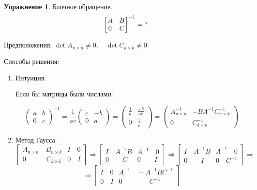 \documentclass[12pt]{article} %
\theoremstyle{definition} %
\newtheorem{exercise}{Упражнение}[section]
\begin{document}
\begin{exercise}
Блочное обращение.
\[
\begin{bmatrix}
A & B \\
0 & C
\end{bmatrix}^{-1}
= \\
?
\]

Предположения: $
\det A_{n \times n} \neq 0; \quad \det C_{k \times k} \neq 0$.

Способы решения:
\begin{enumerate}
\item Интуиция.

Если бы матрицы были числами:

\[ \displaystyle
\begin{pmatrix} a & b\\ 0 & c \end{pmatrix}^{-1} = \frac{1}{ac} \begin{pmatrix} c & -b\\ 0 & a \end{pmatrix} = \begin{pmatrix} \frac{1}{a} & \frac{-b}{ac} \\ 0 & \frac{1}{c} \end{pmatrix} = \begin{pmatrix} A^{-1}_{n \times n} & -BA^{-1}C^{-1}_{n \times k} \\ 0 & C^{-1}_{k \times k} \end{pmatrix}
\]

\item Метод Гаусса.
\[
\left[
\begin{array}{c|c}
A_{n \times n} \quad B_{n \times k} & I \quad 0 \\
0 \quad \quad \quad C_{k \times k} & 0 \quad I
\end{array}
\right] \Rightarrow
\left[
\begin{array}{l|c}
I \quad A^{-1}B & A^{-1} \quad 0 \\
0 \quad \quad C & 0 \quad \quad I
\end{array}
\right] \Rightarrow
\left[
\begin{array}{l|c}
I \quad A^{-1}B & A^{-1} \quad 0 \\
0 \quad \quad I & 0 \quad C^{-1}
\end{array}
\right] \Rightarrow
\]
\[
\Rightarrow
\left[
\begin{array}{c|l}
I \quad 0 & A^{-1} \quad -A^{-1}BC^{-1} \\
0 \quad I & 0 \quad \quad \quad \quad C^{-1}
\end{array}
\right]
\]



\end{enumerate}
\end{exercise}
\end{document}
